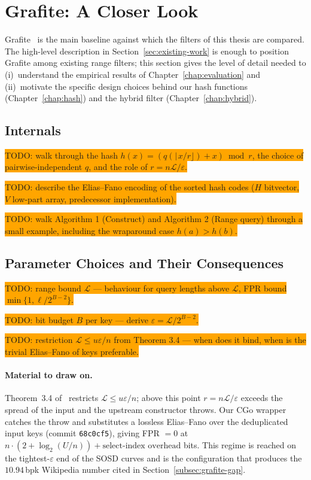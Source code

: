 \section{Grafite: A Closer Look}
\label{sec:grafite-deep-dive}

Grafite~\citep{grafite2024} is the main baseline against which the
filters of this thesis are compared. The high-level description in
Section~\ref{sec:existing-work} is enough to position Grafite among
existing range filters; this section gives the level of detail
needed to (i)~understand the empirical results of
Chapter~\ref{chap:evaluation} and (ii)~motivate the specific design
choices behind our hash functions
(Chapter~\ref{chap:hash}) and the hybrid filter
(Chapter~\ref{chap:hybrid}).

\subsection{Internals}
\label{subsec:grafite-internals}

\colorbox{orange}{TODO: walk through the hash $h(x) = (q(\lfloor x/r \rfloor) + x) \bmod r$, the choice of pairwise-independent $q$, and the role of $r = n\mathcal{L}/\varepsilon$.}

\colorbox{orange}{TODO: describe the Elias--Fano encoding of the sorted hash codes ($H$ bitvector, $V$ low-part array, predecessor implementation).}

\colorbox{orange}{TODO: walk Algorithm 1 (Construct) and Algorithm 2 (Range query) through a small example, including the wraparound case $h(a) > h(b)$.}

\subsection{Parameter Choices and Their Consequences}
\label{subsec:grafite-params}

\colorbox{orange}{TODO: range bound $\mathcal{L}$ --- behaviour for query lengths above $\mathcal{L}$, FPR bound $\min\{1, \ell/2^{B-2}\}$.}

\colorbox{orange}{TODO: bit budget $B$ per key --- derive $\varepsilon = \mathcal{L}/2^{B-2}$.}

\colorbox{orange}{TODO: restriction $\mathcal{L} \leq u\varepsilon/n$ from Theorem 3.4 --- when does it bind, when is the trivial Elias--Fano of keys preferable.}

\paragraph{Material to draw on.}
Theorem~3.4 of~\citep{grafite2024} restricts $\mathcal{L} \leq
u\varepsilon/n$; above this point $r = n\mathcal{L}/\varepsilon$
exceeds the spread of the input and the upstream constructor
throws. Our CGo wrapper catches the throw and substitutes a
lossless Elias--Fano over the deduplicated input keys (commit
\texttt{68c0cf5}), giving FPR $= 0$ at
$n \cdot (2 + \log_2(U/n)) + \text{select-index overhead}$ bits.
This regime is reached on the tightest-$\varepsilon$ end of the
SOSD curves and is the configuration that produces the
$10.94$\,bpk Wikipedia number cited in
Section~\ref{subsec:grafite-gap}.

